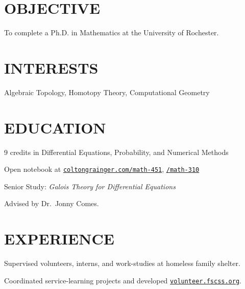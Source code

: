 \documentclass[margin]{res}
\begin{document}
\begin{resume}

\printheader
\section{OBJECTIVE}

To complete a Ph.D. in Mathematics at the University of Rochester.

\section{INTERESTS}

Algebraic Topology, Homotopy Theory, Computational Geometry

\section{EDUCATION}

\begin{details}
\item 9 credits in Differential Equations, Probability, and Numerical Methods
\item Open notebook at \href{http://coltongrainger.com/math-451}{\texttt{coltongrainger.com/math-451}}, \href{http://coltongrainger.com/math-310}{\texttt{/math-310}}
\end{details}

\begin{details}
\item Senior Study: \emph{Galois Theory for Differential Equations}
\item Advised by Dr.~Jonny Comes.
\end{details}

\section{EXPERIENCE}

\begin{details}
\item{Supervised volunteers, interns, and work-studies at homeless family shelter.}
\item{Coordinated service-learning projects and developed \href{http://volunteer.fscss.org}{\texttt{volunteer.fscss.org}}.}
\end{details}


\end{resume}
\end{document}
